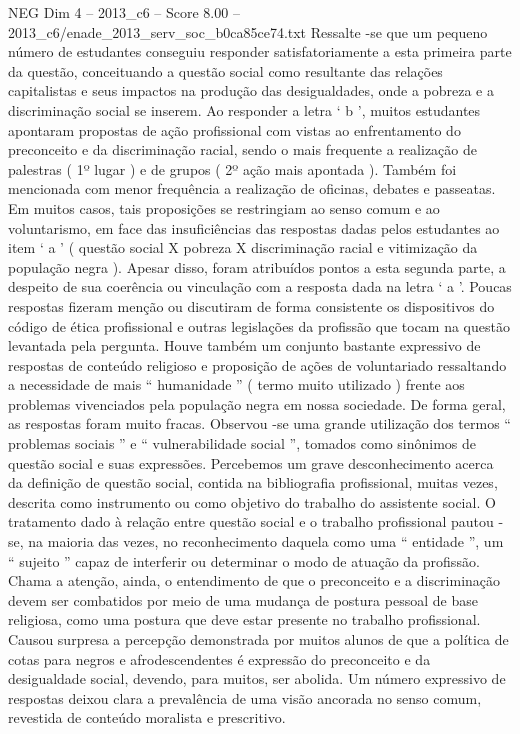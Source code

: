 \begin{textsample}{NEG Dim 4 – 2013\_c6 – Score 8.00 – 2013\_c6/enade\_2013\_serv\_soc\_b0ca85ce74.txt}
Ressalte -se que um pequeno número de estudantes conseguiu responder satisfatoriamente a esta primeira parte da questão, conceituando a questão social como resultante das relações capitalistas e seus impactos na produção das desigualdades, onde a pobreza e a discriminação social se inserem.
Ao responder a letra ‘ b ’, muitos estudantes apontaram propostas de ação profissional com vistas ao enfrentamento do preconceito e da discriminação racial, sendo o mais frequente a realização de palestras ( 1º lugar ) e de grupos ( 2º ação mais apontada ).
Também foi mencionada com menor frequência a realização de oficinas, debates e passeatas.
Em muitos casos, tais proposições se restringiam ao senso comum e ao voluntarismo, em face das insuficiências das respostas dadas pelos estudantes ao item ‘ a ’ ( questão social X pobreza X discriminação racial e vitimização da população negra ).
Apesar disso, foram atribuídos pontos a esta segunda parte, a despeito de sua coerência ou vinculação com a resposta dada na letra ‘ a ’.
Poucas respostas fizeram menção ou discutiram de forma consistente os dispositivos do código de ética profissional e outras legislações da profissão que tocam na questão levantada pela pergunta.
Houve também um conjunto bastante expressivo de respostas de conteúdo religioso e proposição de ações de voluntariado ressaltando a necessidade de mais “ humanidade ” ( termo muito utilizado ) frente aos problemas vivenciados pela população negra em nossa sociedade.
De forma geral, as respostas foram muito fracas.
Observou -se uma grande utilização dos termos “ problemas sociais ” e “ vulnerabilidade social ”, tomados como sinônimos de questão social e suas expressões.
Percebemos um grave desconhecimento acerca da definição de questão social, contida na bibliografia profissional, muitas vezes, descrita como instrumento ou como objetivo do trabalho do assistente social.
O tratamento dado à relação entre questão social e o trabalho profissional pautou -se, na maioria das vezes, no reconhecimento daquela como uma “ entidade ”, um “ sujeito ” capaz de interferir ou determinar o modo de atuação da profissão.
Chama a atenção, ainda, o entendimento de que o preconceito e a discriminação devem ser combatidos por meio de uma mudança de postura pessoal de base religiosa, como uma postura que deve estar presente no trabalho profissional.
Causou surpresa a percepção demonstrada por muitos alunos de que a política de cotas para negros e afrodescendentes é expressão do preconceito e da desigualdade social, devendo, para muitos, ser abolida.
Um número expressivo de respostas deixou clara a prevalência de uma visão ancorada no senso comum, revestida de conteúdo moralista e prescritivo.

\end{textsample}
